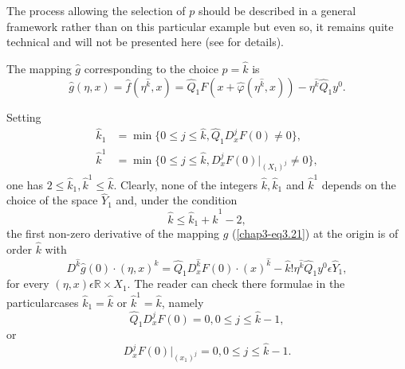 The process allowing the selection of $p$ should be described in a
general framework rather than on this particular example but even so,
it remains quite technical and will not be presented here (see \cite{31}
for details).

The mapping $\hat{g}$ corresponding to the choice $p = \hat{k}$ is 
\begin{equation*}
\hat{g}(\eta, x) = \hat{f}(\eta^{\hat{k}}, x) = \hat{Q}_{1}F(x +
\hat{\varphi}(\eta^{\hat{k}}, x)) - \eta^{\hat{k}}
\hat{Q}_{1}y^{0}.\tag{3.21}\label{chap3-eq3.21} 
\end{equation*}

Setting
\begin{align*}
\hat{k}_{1} & = \min \{0 \leq j \leq \hat{k}, \hat{Q}_{1}D_{x}^{j}F(0)
\neq 0\},\tag{3.22}\label{chap3-eq3.22}\\
\hat{k}^{1} & = \min \{0 \leq j \leq \hat{k}, D_{x}^{j}F(0)
|_{(X_{1})^{j}} \neq 0\},\tag{3.23}\label{chap3-eq3.23}
\end{align*}
one has $2 \leq \hat{k}_{1}, \hat{k}^{1} \leq \hat{k}$. Clearly, none
of the integers $\hat{k}, \hat{k}_{1}$ and $\hat{k}^{1}$ depends on
the choice of the space $\hat{Y}_{1}$ and, under the condition 
\begin{equation*}
\hat{k} \leq \hat{k}_{1} + \hat{k}^{1} - 2,\tag{3.24}\label{chap3-eq3.24}
\end{equation*}
the first non-zero derivative of the mapping $\hat{g}$
(\ref{chap3-eq3.21}) at the origin is of order $\hat{k}$ with
\begin{equation*}
D^{\hat{k}}\hat{g}(0) \cdot (\eta, x)^{\hat{k}} =
\hat{Q}_{1}D_{x}^{\hat{k}} F(0) \cdot (x)^{\hat{k}} - \hat{k}!
\eta^{\hat{k}}\hat{Q}_{1}y^{0} \epsilon
\hat{Y}_{1},\tag{3.25}\label{chap3-eq3.25} 
\end{equation*}
for every $(\eta, x) \epsilon \mathbb{R} \times X_{1}$. The reader can
check there formulae in the particular\pageoriginale cases
$\hat{k}_{1} = \hat{k}$ or $\hat{k}^{1} = \hat{k}$, namely
$$
\hat{Q}_{1} D_{x}^{j}F(0) = 0, 0 \leq j \leq \hat{k}-1,
$$
or
$$
D_{x}^{j}F(0) |_{(x_{1})^{j}} = 0, 0 \leq j \leq \hat{k}-1.
$$

